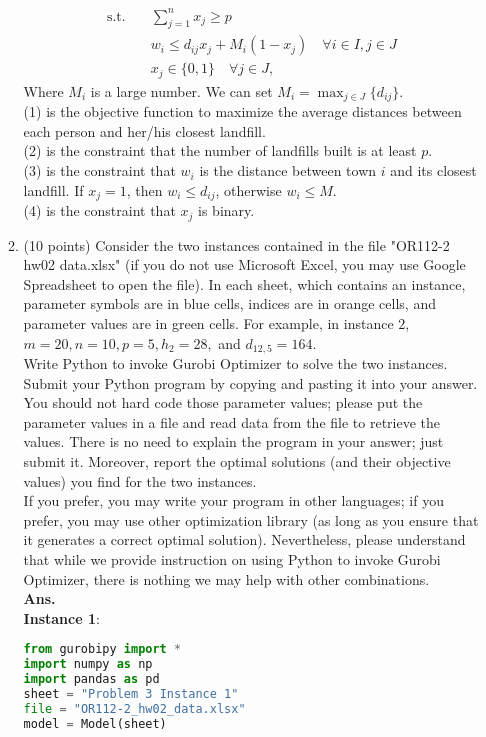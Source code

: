 \documentclass[12pt]{article}
\begin{document}
\begin{enumerate}
\begin{enumerate}
\begin{align}
                              \text{s.t.}\quad & \sum_{j=1}^n x_j \geq p                                       \\
                                               & w_i \leq d_{ij}x_j + M_i(1-x_j) \quad \forall i \in I, j\in J \\
                                               & x_j \in \{0,1\} \quad \forall j \in J,
                        \end{align}
                        Where $M_i$ is a large number. We can set $M_i = \max_{j\in J}\{d_{ij}\}$.\\
                        (1) is the objective function to maximize the average distances between each person and her/his closest landfill.\\
                        (2) is the constraint that the number of landfills built is at least $p$.\\
                        (3) is the constraint that
                        $w_i$ is the distance between town $i$ and its closest landfill. If $x_j = 1$, then $w_i \leq d_{ij}$, otherwise $w_i \leq M$.\\
                        (4) is the constraint that $x_j$ is binary.
                  \item (10 points) Consider the two instances contained in the file "OR112-2 hw02 data.xlsx" (if you do not use Microsoft Excel, you may use Google Spreadsheet to open the file). In each sheet, which contains an instance, parameter symbols are in blue cells, indices are in orange cells, and parameter values are in green cells. For example, in instance $2$, $m = 20, n = 10, p = 5, h_2 = 28,$ and $d_{12,5} = 164$.\\
                        Write Python to invoke Gurobi Optimizer to solve the two instances. Submit your Python
                        program by copying and pasting it into your answer. You should not hard code those parameter values; please put the parameter values in a file and read data from the file to retrieve
                        the values. There is no need to explain the program in your answer; just submit it. Moreover,
                        report the optimal solutions (and their objective values) you find for the two instances.\\
                        If you prefer, you may write your program in other languages; if you prefer, you may use
                        other optimization library (as long as you ensure that it generates a correct optimal solution).
                        Nevertheless, please understand that while we provide instruction on using Python to invoke
                        Gurobi Optimizer, there is nothing we may help with other combinations.\\
                        \textbf{Ans.}\\
                        \textbf{Instance 1}:
                        \begin{lstlisting}[language=Python]
from gurobipy import *
import numpy as np
import pandas as pd
sheet = "Problem 3 Instance 1"
file = "OR112-2_hw02_data.xlsx"
model = Model(sheet)


\end{lstlisting}
\end{enumerate}
\end{enumerate}
\end{document}
